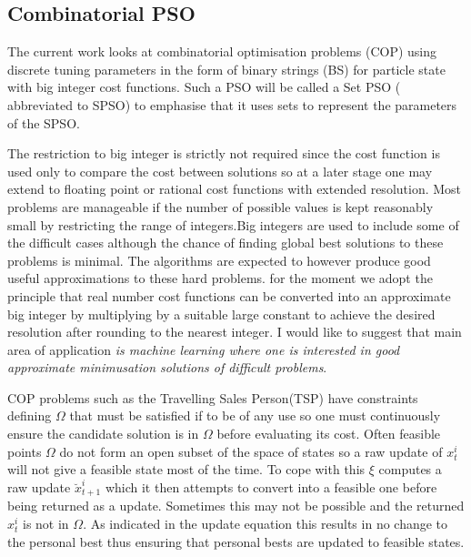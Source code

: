 \documentclass[a4paper,oneside,english]{article}
\numberwithin{equation}{section}
\numberwithin{figure}{section}
\begin{document}
\subsection{Combinatorial PSO}
The current work looks at combinatorial optimisation problems (COP) using discrete tuning parameters in the form of binary strings (BS) for particle state with big integer cost functions. Such  a PSO will be called a Set PSO ( abbreviated to SPSO) to emphasise that it uses sets to represent the parameters of the SPSO.   

The restriction to big integer is strictly not required since the cost function is used only to compare the cost between solutions so at a later stage one  may extend to floating point or rational cost functions with extended resolution. Most problems are manageable if the number of possible values is kept reasonably small by restricting the range of integers.Big integers are used to include some of the difficult cases although the chance of finding global best solutions to these problems is minimal. The algorithms are expected to however produce good useful approximations to these hard problems. for the moment we adopt the principle that real number cost functions can be converted into an approximate big integer by multiplying by a suitable large constant  to achieve the desired resolution after rounding to the nearest integer. I would like to suggest that main area of application \emph{is machine learning where one is interested in good approximate minimusation solutions of difficult problems}.

COP problems such as the Travelling Sales Person(TSP) have constraints defining $\varOmega$ that must be satisfied if to be of any use so one must continuously ensure the candidate solution is in $\varOmega$ before evaluating its cost. Often feasible points $\varOmega$ do not form an open subset of the space of states so a raw update of $x_t^i$ will not give a feasible state most of the time. To cope with this $\xi$ computes a raw update $\breve{x}_{t+1}^i$ which it then attempts to  convert into a feasible one before being returned as a update. Sometimes this may not be possible and the returned $x_t^i$ is not in $\varOmega$. As indicated in the update equation this results in no change to the personal best thus ensuring that personal bests are updated to feasible states.   
\end{document}
